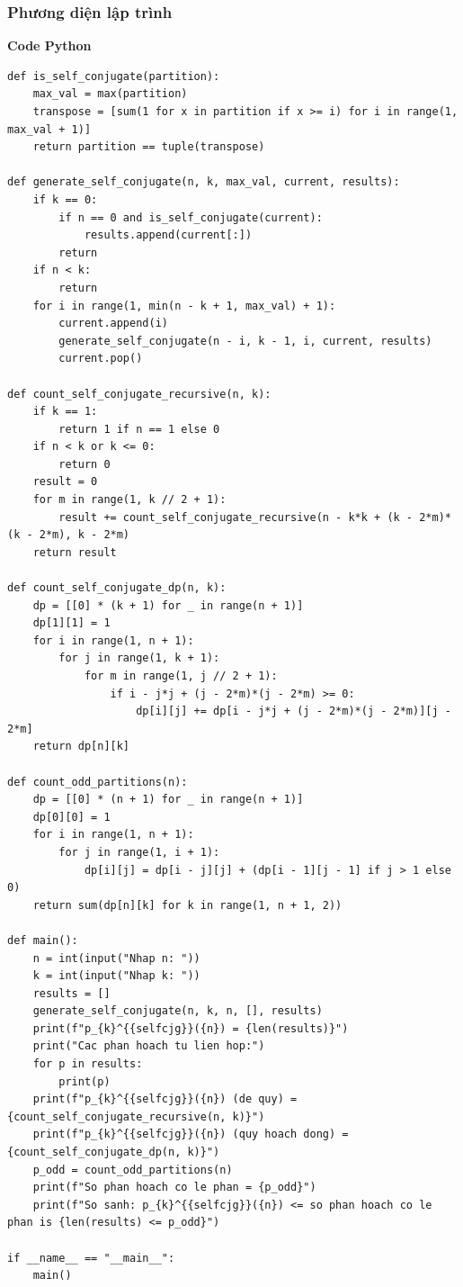 \documentclass[a4paper,12pt]{article}
\begin{document}
\subsubsection{Phương diện lập trình}
\textbf{Code Python}
\begin{lstlisting}
def is_self_conjugate(partition):
    max_val = max(partition)
    transpose = [sum(1 for x in partition if x >= i) for i in range(1, max_val + 1)]
    return partition == tuple(transpose)

def generate_self_conjugate(n, k, max_val, current, results):
    if k == 0:
        if n == 0 and is_self_conjugate(current):
            results.append(current[:])
        return
    if n < k:
        return
    for i in range(1, min(n - k + 1, max_val) + 1):
        current.append(i)
        generate_self_conjugate(n - i, k - 1, i, current, results)
        current.pop()

def count_self_conjugate_recursive(n, k):
    if k == 1:
        return 1 if n == 1 else 0
    if n < k or k <= 0:
        return 0
    result = 0
    for m in range(1, k // 2 + 1):
        result += count_self_conjugate_recursive(n - k*k + (k - 2*m)*(k - 2*m), k - 2*m)
    return result

def count_self_conjugate_dp(n, k):
    dp = [[0] * (k + 1) for _ in range(n + 1)]
    dp[1][1] = 1
    for i in range(1, n + 1):
        for j in range(1, k + 1):
            for m in range(1, j // 2 + 1):
                if i - j*j + (j - 2*m)*(j - 2*m) >= 0:
                    dp[i][j] += dp[i - j*j + (j - 2*m)*(j - 2*m)][j - 2*m]
    return dp[n][k]

def count_odd_partitions(n):
    dp = [[0] * (n + 1) for _ in range(n + 1)]
    dp[0][0] = 1
    for i in range(1, n + 1):
        for j in range(1, i + 1):
            dp[i][j] = dp[i - j][j] + (dp[i - 1][j - 1] if j > 1 else 0)
    return sum(dp[n][k] for k in range(1, n + 1, 2))

def main():
    n = int(input("Nhap n: "))
    k = int(input("Nhap k: "))
    results = []
    generate_self_conjugate(n, k, n, [], results)
    print(f"p_{k}^{{selfcjg}}({n}) = {len(results)}")
    print("Cac phan hoach tu lien hop:")
    for p in results:
        print(p)
    print(f"p_{k}^{{selfcjg}}({n}) (de quy) = {count_self_conjugate_recursive(n, k)}")
    print(f"p_{k}^{{selfcjg}}({n}) (quy hoach dong) = {count_self_conjugate_dp(n, k)}")
    p_odd = count_odd_partitions(n)
    print(f"So phan hoach co le phan = {p_odd}")
    print(f"So sanh: p_{k}^{{selfcjg}}({n}) <= so phan hoach co le phan is {len(results) <= p_odd}")

if __name__ == "__main__":
    main()
\end{lstlisting}
\end{document}
